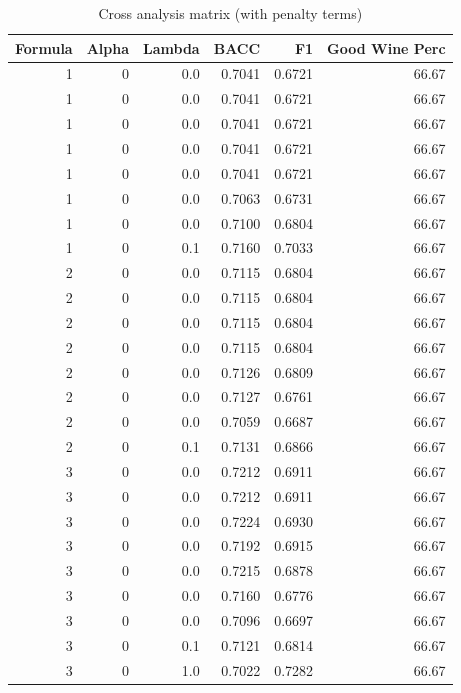 \documentclass[a4paperpaper,9pt,twocolumn,twoside,printwatermark=false]{pinp}
\begin{document}
\begin{table}[ht]
\begin{center}
\begin{tabular}{r|rrrrr}
\hline
Formula & Alpha & Lambda & BACC & F1 & Good Wine Perc \\
\hline
1 & 0 & 0.0 & 0.7041 & 0.6721 & 66.67 \\
1 & 0 & 0.0 & 0.7041 & 0.6721 & 66.67 \\
1 & 0 & 0.0 & 0.7041 & 0.6721 & 66.67 \\
1 & 0 & 0.0 & 0.7041 & 0.6721 & 66.67 \\
1 & 0 & 0.0 & 0.7041 & 0.6721 & 66.67 \\
1 & 0 & 0.0 & 0.7063 & 0.6731 & 66.67 \\
1 & 0 & 0.0 & 0.7100 & 0.6804 & 66.67 \\
1 & 0 & 0.1 & 0.7160 & 0.7033 & 66.67 \\
2 & 0 & 0.0 & 0.7115 & 0.6804 & 66.67 \\
2 & 0 & 0.0 & 0.7115 & 0.6804 & 66.67 \\
2 & 0 & 0.0 & 0.7115 & 0.6804 & 66.67 \\
2 & 0 & 0.0 & 0.7115 & 0.6804 & 66.67 \\
2 & 0 & 0.0 & 0.7126 & 0.6809 & 66.67 \\
2 & 0 & 0.0 & 0.7127 & 0.6761 & 66.67 \\
2 & 0 & 0.0 & 0.7059 & 0.6687 & 66.67 \\
2 & 0 & 0.1 & 0.7131 & 0.6866 & 66.67 \\
3 & 0 & 0.0 & 0.7212 & 0.6911 & 66.67 \\
3 & 0 & 0.0 & 0.7212 & 0.6911 & 66.67 \\
3 & 0 & 0.0 & 0.7224 & 0.6930 & 66.67 \\
3 & 0 & 0.0 & 0.7192 & 0.6915 & 66.67 \\
3 & 0 & 0.0 & 0.7215 & 0.6878 & 66.67 \\
3 & 0 & 0.0 & 0.7160 & 0.6776 & 66.67 \\
3 & 0 & 0.0 & 0.7096 & 0.6697 & 66.67 \\
3 & 0 & 0.1 & 0.7121 & 0.6814 & 66.67 \\
3 & 0 & 1.0 & 0.7022 & 0.7282 & 66.67 \\
\hline
\end{tabular}
\caption{\label{tab:CrossAnalysis2}Cross analysis matrix (with penalty terms)}
\end{center}
\end{table}
\end{document}
